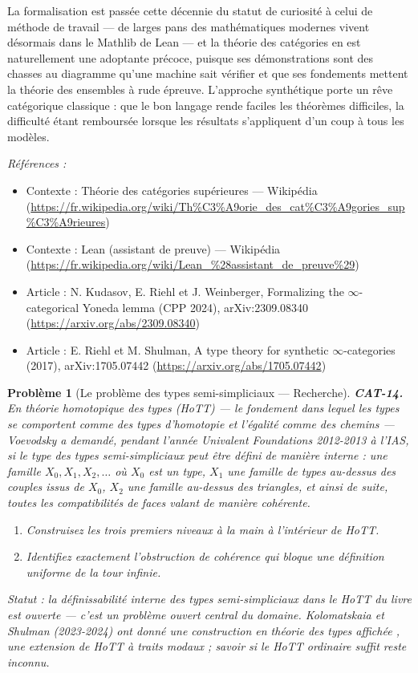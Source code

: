 \documentclass[11pt]{article}
\newtheorem{problem}{Problème}
\newenvironment{refs}{\par\small\noindent\emph{Références :}\begin{itemize}\setlength\itemsep{0pt}}{\end{itemize}\normalsize}
\begin{document}
\noindent La formalisation est passée cette décennie du statut de curiosité à celui de
méthode de travail --- de larges pans des mathématiques modernes vivent désormais dans le Mathlib de
Lean --- et la théorie des catégories en est naturellement une adoptante précoce, puisque ses
démonstrations sont des chasses au diagramme qu'une machine sait vérifier et que ses fondements
mettent la théorie des ensembles à rude épreuve. L'approche synthétique porte un rêve catégorique
classique : que le bon langage rende faciles les théorèmes difficiles, la difficulté étant
remboursée lorsque les résultats s'appliquent d'un coup à tous les modèles.

\begin{refs}
\item Contexte : Théorie des catégories supérieures --- Wikipédia (\url{https://fr.wikipedia.org/wiki/Th%C3%A9orie_des_cat%C3%A9gories_sup%C3%A9rieures})
\item Contexte : Lean (assistant de preuve) --- Wikipédia (\url{https://fr.wikipedia.org/wiki/Lean_%28assistant_de_preuve%29})
\item Article : N. Kudasov, E. Riehl et J. Weinberger, \og{} Formalizing the $\infty$-categorical Yoneda lemma \fg{} (CPP 2024), arXiv:2309.08340 (\url{https://arxiv.org/abs/2309.08340})
\item Article : E. Riehl et M. Shulman, \og{} A type theory for synthetic $\infty$-categories \fg{} (2017), arXiv:1705.07442 (\url{https://arxiv.org/abs/1705.07442})
\end{refs}

\bigskip

\begin{problem}[{Le problème des types semi-simpliciaux --- Recherche}]
\textbf{CAT-14.} En théorie homotopique des types (HoTT) --- le fondement dans lequel les types
se comportent comme des types d'homotopie et l'égalité comme des chemins --- Voevodsky a demandé,
pendant l'année Univalent Foundations 2012-2013 à l'IAS, si le type des \textit{types
semi-simpliciaux} peut être défini de manière interne : une famille
$ X_0, X_1, X_2, \ldots $ où $ X_0 $ est un type, $ X_1 $ une famille de types au-dessus des
couples issus de $ X_0 $, $ X_2 $ une famille au-dessus des triangles, et ainsi de suite,
toutes les compatibilités de faces valant de manière cohérente.
\begin{enumerate}
\item[(a)] Construisez les trois premiers niveaux à la main à l'intérieur de HoTT.
\item[(b)] Identifiez exactement l'obstruction de cohérence qui bloque une définition uniforme de la tour
infinie.
\end{enumerate}
\textit{Statut : la définissabilité interne des types semi-simpliciaux dans le HoTT du livre est
ouverte --- c'est un problème ouvert central du domaine. Kolomatskaia et Shulman (2023-2024) ont
donné une construction en \og{} théorie des types affichée \fg{}, une extension de HoTT à traits modaux ;
savoir si le HoTT ordinaire suffit reste inconnu.}
\end{problem}
\end{document}
